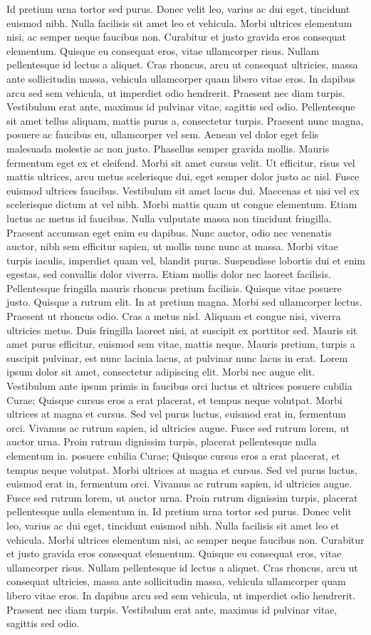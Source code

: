\documentclass[twoside]{article}
\newcommand{\numpar}[1]{\doinsidethislinehook{#1\markboth{#1}{#1}}}
\begin{document}
Id pretium urna tortor sed purus. Donec velit leo, varius ac dui eget, tincidunt euismod nibh. Nulla facilisis sit amet leo et vehicula. Morbi ultrices elementum nisi, ac semper neque faucibus non. Curabitur et justo gravida eros consequat elementum. Quisque eu consequat eros, vitae ullamcorper risus. Nullam pellentesque id lectus a aliquet. Cras rhoncus, arcu ut consequat ultricies, massa ante sollicitudin massa, vehicula ullamcorper quam libero vitae eros. In dapibus arcu sed sem vehicula, ut imperdiet odio hendrerit. Praesent nec diam turpis. Vestibulum erat ante, maximus id pulvinar vitae, sagittis sed odio. Pellentesque sit amet tellus aliquam, mattis purus a, consectetur turpis. Praesent nunc magna, posuere ac faucibus eu, ullamcorper vel sem. Aenean vel dolor eget felis malesuada molestie ac non justo. Phasellus semper gravida mollis. Mauris fermentum eget ex et eleifend. Morbi sit amet cursus velit. Ut efficitur, risus vel mattis ultrices, arcu metus scelerisque dui, eget semper dolor justo ac nisl. Fusce euismod ultrices faucibus. Vestibulum sit amet lacus dui. Maecenas\numpar{CCC} et nisi vel ex scelerisque dictum at vel nibh. Morbi mattis quam ut congue elementum. Etiam luctus ac metus id faucibus. Nulla vulputate massa non tincidunt fringilla. Praesent accumsan eget enim eu dapibus. Nunc auctor, odio nec venenatis auctor, nibh sem efficitur sapien, ut mollis nunc nunc at massa. Morbi vitae turpis iaculis, imperdiet quam vel, blandit purus. Suspendisse lobortis dui et enim egestas, sed convallis dolor viverra. Etiam mollis dolor nec laoreet facilisis. Pellentesque fringilla mauris rhoncus pretium facilisis. Quisque vitae posuere justo. Quisque a rutrum elit.\numpar{DDD} In at pretium magna. Morbi sed ullamcorper lectus. Praesent ut rhoncus odio. Cras a metus nisl. Aliquam et congue nisi, viverra ultricies metus. Duis fringilla laoreet nisi, at suscipit ex porttitor sed. Mauris sit amet purus efficitur, euismod sem vitae, mattis neque. Mauris pretium, turpis a suscipit pulvinar, est nunc lacinia lacus, at pulvinar nunc lacus in erat. Lorem ipsum dolor sit amet, consectetur adipiscing elit. Morbi nec augue elit. Vestibulum ante ipsum primis in faucibus orci luctus et ultrices\numpar{EEE} posuere cubilia Curae; Quisque cursus eros a erat placerat, et tempus neque volutpat. Morbi ultrices at magna et cursus. Sed vel purus luctus, euismod erat in, fermentum orci. Vivamus ac rutrum sapien, id ultricies augue. Fusce sed rutrum lorem, ut auctor urna. Proin rutrum dignissim turpis, placerat pellentesque nulla elementum in. posuere cubilia Curae; Quisque cursus eros a erat placerat, et tempus neque volutpat. Morbi ultrices at magna et cursus. \numpar{FFF} Sed vel purus luctus, euismod erat in, fermentum orci. Vivamus ac rutrum sapien, id ultricies augue. Fusce sed rutrum lorem, ut auctor urna. Proin rutrum dignissim turpis, placerat pellentesque nulla elementum in. Id pretium urna tortor sed purus. Donec velit leo, varius ac dui eget, tincidunt euismod nibh. Nulla facilisis sit amet leo et vehicula. Morbi ultrices elementum nisi, ac semper neque faucibus non. Curabitur et justo gravida eros consequat elementum. Quisque eu consequat eros, vitae ullamcorper risus. Nullam pellentesque id lectus a aliquet. Cras rhoncus, arcu ut consequat ultricies, \numpar{GGG} massa ante sollicitudin massa, vehicula ullamcorper quam libero vitae eros. In dapibus arcu sed sem vehicula, ut imperdiet odio hendrerit. Praesent nec diam turpis. Vestibulum erat ante, maximus id pulvinar vitae, sagittis sed odio.

\endnumbering
\end{document}
